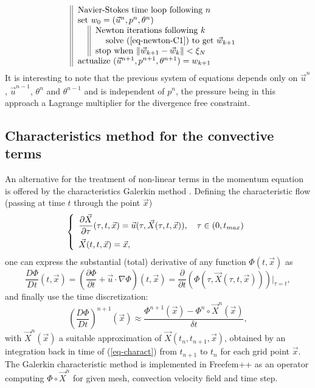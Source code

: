 \begin{equation} \label{eq-Newton-algo}
\begin{tabular}{||ll}
\multicolumn{2}{||l}{Navier-Stokes time loop following $n$}\\
\multicolumn{2}{||l}{set  $w_0=(\vec{u}^{n}, p^{n}, \theta^{n})$}\\
& \begin{tabular}[t]{||ll}
\multicolumn{2}{||l}{Newton iterations  following $k$}\\
&solve (\ref{eq-newton-C1}) to get $ \vec w_{k+1} $\\
\multicolumn{2}{||l}{stop when  $\| \vec w_{k+1} - \vec w_k \| < \xi_N$}
\end{tabular}\\
\multicolumn{2}{||l}{actualize $(\vec{u}^{n+1}, p^{n+1}, \theta^{n+1}) = w_{k+1}$}
\end{tabular}
\end{equation}
It is interesting to note that the previous system of equations depends only on $\vec{u}^n$, $\vec{u}^{n-1}$, $\theta^n$ and $\theta^{n-1}$ and is independent of $p^n$, the pressure being in this approach a Lagrange multiplier for the divergence free constraint. 

\subsection{Characteristics method for the convective terms}

An alternative for the treatment of non-linear terms in the momentum equation is offered by the characteristics Galerkin method \cite{Pironneau92}. Defining the characteristic flow (passing at time $t$ through the point $\vec{x}$)
\begin{equation}
\left\{
\begin{array}{l}\vspace{0.2cm}
\ds\frac{\partial \vec{X} }{\partial \tau}(\tau, t, \vec{x})=\vec{u} (\tau,\vec{X} (\tau,t, \vec{x})), \quad \tau\in (0,t_{max})\\
\vec{X} (t, t, \vec{x}) = \vec{x},
\end{array}
\right.
\label{eq-charactD}
\end{equation}
one can express the substantial (total) derivative of any function $\Phi(t,\vec{x})$ as
\begin{equation}
\frac{D\Phi}{Dt}(t,\vec{x})=\left( \frac{\partial \Phi}{\partial
	t}+\vec{u}\cdot\nabla \Phi \right)(t,\vec{x})=\frac{\partial}{\partial
	t}\left(\Phi(\tau, \vec{X}(\tau,t, \vec{x}))\right)|_{\tau=t},
\end{equation}
and finally use the time discretization:
\begin{equation}
\left(\frac{D\Phi}{Dt}\right)^{n+1}(\vec{x})\approx\frac{\Phi^{n+1}(\vec{x})-\Phi^{n}\circ \vec{X}^n(\vec{x})}{\delta t},
\end{equation}
with $\vec{X}^n(\vec{x})$ a suitable approximation of $\vec{X}(t_n,t_{n+1},\vec{x})$, obtained by an integration back in time of (\ref{eq-charact}) from $t_{n+1}$ to $t_n$ for each grid point $\vec{x}$. The Galerkin characteristic method is implemented in Freefem++ as an operator computing $\Phi \circ \vec{X}^n$ for given mesh, convection velocity field and time step.

